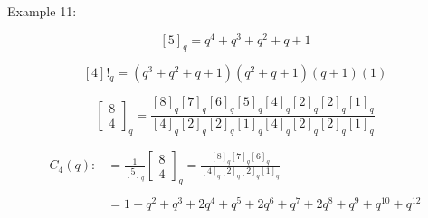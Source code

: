 \documentclass[12pt]{amsart}
\begin{document}
\begin{mdframed}[backgroundcolor=green!10]
	\label{exemple q-analogue} %
	\begin{it}Example 11: \end{it}

	\[[5]_q=q^4+q^3+q^2+q+1\]

	\[[4]!_q=(q^3+q^2+q+1)(q^2+q+1)(q+1)(1)\]

	\[\begin{bmatrix} 8\\4 \end{bmatrix}_q=\frac{[8]_q[7]_q[6]_q[5]_q[4]_q[2]_q[2]_q[1]_q}{[4]_q[2]_q[2]_q[1]_q[4]_q[2]_q[2]_q[1]_q}\]

	\begin{align*}C_4(q):&=\frac{1}{[5]_q}\begin{bmatrix} 8\\4 \end{bmatrix}_q=\frac{[8]_q[7]_q[6]_q}{[4]_q[2]_q[2]_q[1]_q}
		\\
		\\				&=1+q^2+q^3+2q^4+q^5+2q^6+q^7+2q^8+q^9+q^{10}+q^{12}
	\end{align*}
	\hyperref[retour q-analogue]{}
\end{mdframed}
\end{document}
